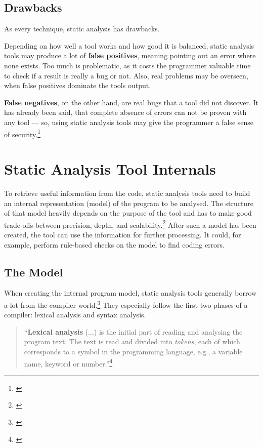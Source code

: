 \subsection{Drawbacks}

As every technique, static analysis has drawbacks. 

Depending on how well a tool works and how good it is balanced, static analysis tools may produce a lot of \textbf{false positives}, meaning pointing out an error where none exists. Too much  is problematic, as it costs the programmer valuable time to check if a result is really a bug or not. Also, real problems may be overseen, when false positives dominate the tools output.

\textbf{False negatives}, on the other hand, are real bugs that a tool did not discover. It has already been said, that complete absence of errors can not be proven with \linebreak any tool --- so, using static analysis tools may give the programmer a false sense of security.\footnote{\citep[23]{SecureProgramming}}


\section{Static Analysis Tool Internals}

To retrieve useful information from the code, static analysis tools need to build an internal representation (model) of the program to be analysed. The structure of that model heavily depends on the purpose of the tool and has to make good trade-offs between precision, depth, and scalability.\footnote{\citep[45]{SecureProgramming}} After such a model has been created, the tool can use the information for further processing. It could, for example, perform rule-based checks on the model to find coding errors.

\subsection{The Model}

When creating the internal program model, static analysis tools generally borrow a lot from the compiler world.\footnote{\citep[72]{SecureProgramming}} They especially follow the first two phases of a compiler: lexical analysis and syntax analysis.

\begin{quotation}
``\textbf{Lexical analysis} (...) is the initial part of reading and analysing the program text: The text is read and divided into \textit{tokens}, each of which corresponds to a symbol in the programming language, e.g., a variable name, keyword or number.''\footnote{\citep[2]{CompilerBasics}}
\end{quotation}

